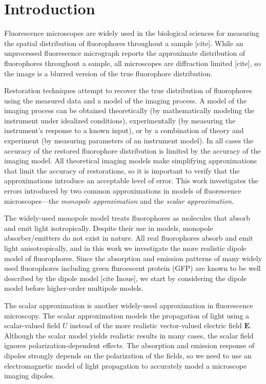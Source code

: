 \documentclass[]{osa-article}
\providecommand{\mb}[1]{\mathbf{#1}}
\begin{document}
\section{Introduction}

Fluorescence microscopes are widely used in the biological sciences for
measuring the spatial distribution of fluorophores throughout a sample [cite].
While an unprocessed fluorescence micrograph reports the approximate
distribution of fluorophores throughout a sample, all microscopes are
diffraction limited [cite], so the image is a blurred version of the true
fluorophore distribution. 

Restoration techniques attempt to recover the true distribution of fluorophores
using the measured data and a model of the imaging process. A model of the
imaging process can be obtained theoretically (by mathematically modeling the
instrument under idealized conditions), experimentally (by measuring the
instrument's response to a known input), or by a combination of theory and
experiment (by measuring parameters of an instrument model). In all cases the
accuracy of the restored fluorophore distribution is limited by the accuracy of
the imaging model. All theoretical imaging models make simplifying
approximations that limit the accuracy of restorations, so it is important to
verify that the approximations introduce an acceptable level of error. This work
investigates the errors introduced by two common approximations in models of
fluorescence microscopes---the \textit{monopole approximation} and the
\textit{scalar approximation}.

The widely-used monopole model treats fluorophores as molecules that absorb and
emit light isotropically. Despite their use in models, monopole
absorber/emitters do not exist in nature. All real fluorophores absorb and emit
light anisotropically, and in this work we investigate the more realistic dipole
model of fluorophores. Since the absorption and emission patterns of many widely
used fluorophores including green fluroescent protein (GFP) are known to be well
described by the dipole model [cite Inoue], we start by considering the dipole
model before higher-order multipole models.

The scalar approximation is another widely-used approximation in fluorescence
microscopy. The scalar approximation models the propagation of light using a
scalar-valued field $U$ instead of the more realistic vector-valued electric
field $\mb{E}$. Although the scalar model yields realistic results in many
cases, the scalar field ignores polarization-dependent effects. The absorption
and emission response of dipoles strongly depends on the polarization of the
fields, so we need to use an electromagnetic model of light propagation to
accurately model a microscope imaging dipoles.
\end{document}
